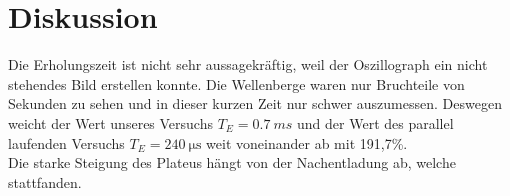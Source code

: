 \section{Diskussion}
\label{sec:Diskussion}
Die Erholungszeit ist nicht sehr aussagekräftig, weil der Oszillograph ein nicht stehendes Bild erstellen konnte.
Die Wellenberge waren nur Bruchteile von Sekunden zu sehen und in dieser kurzen Zeit nur schwer auszumessen.
Deswegen weicht der Wert unseres Versuchs $T_E=\SI{0.7}{ms}$ und der Wert des parallel laufenden Versuchs $T_E=\SI{240}{\micro\second}$ weit voneinander ab mit 191,7\%. \\
Die starke Steigung des Plateus hängt von der Nachentladung ab, welche stattfanden.
